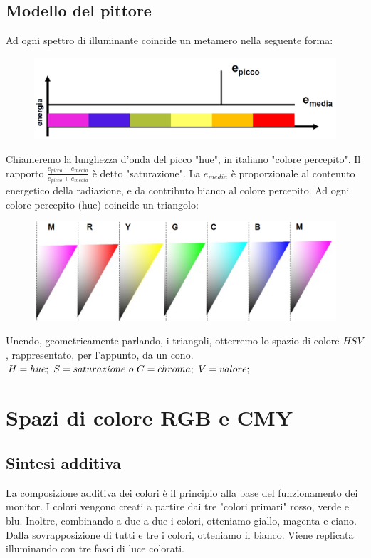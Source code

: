 \documentclass{report}
\begin{document}
	\subsection{Modello del pittore}
	Ad ogni spettro di illuminante coincide un metamero nella seguente forma:\\
	\begin{figure}[htp]
		\centering
		\includegraphics[width=1\linewidth]{modellodelpittore.png}
	\end{figure}
	Chiameremo la lunghezza d'onda del picco "hue", in italiano "colore percepito". Il rapporto $\frac{e_{picco}- e_{media}}{e_{picco} + e_{media}}$ è detto "saturazione". La $e_{media}$ è proporzionale al contenuto energetico della radiazione, e da contributo bianco al colore percepito.
	Ad ogni colore percepito (hue) coincide un triangolo:\\
	\begin{figure}[htp]
		\centering
		\includegraphics[width=1\linewidth]{hue1.png}
	\end{figure}
	Unendo, geometricamente parlando, i triangoli, otterremo lo spazio di colore $HSV$, rappresentato, per l'appunto, da un cono.
	$\\ H = hue;\\ \ S = saturazione \ o \ C = chroma ;\\ \ V = valore;$
		
		
	\section{Spazi di colore RGB e CMY}
	\subsection{Sintesi additiva}
	La composizione additiva dei colori è il principio alla base del funzionamento dei monitor. I colori vengono creati a partire dai tre "colori primari" rosso, verde e blu. Inoltre, combinando a due a due i colori, otteniamo giallo, magenta e ciano. Dalla sovrapposizione di tutti e tre i colori, otteniamo il bianco. Viene replicata illuminando con tre fasci di luce colorati.
\end{document}
